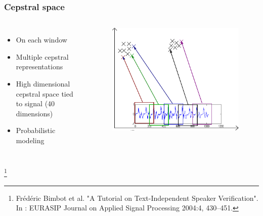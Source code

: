\documentclass[11pt,english]{beamer}
\newcommand\blfootnote[1]{%
 \begingroup
  \renewcommand\thefootnote{}\footnote{#1}%
  \addtocounter{footnote}{-1}%
  \endgroup
}
\begin{document}
\begin{frame}
  \frametitle{Cepstral space}
  \begin{columns}
    \begin{itemize}
    \item On each window
    \item Multiple cepstral representations
    \item High dimensional cepstral space tied to signal (40 dimensions)
    \item Probabilistic modeling
    \end{itemize}
      \begin{figure}
        \centering
       \includegraphics[scale = 0.5]{cepstral_space.pdf}
      \end{figure}
    \end{columns}
     \blfootnote{Frédéric Bimbot et al. "A Tutorial on Text-Independent Speaker Verification".  In : EURASIP Journal on Applied Signal Processing 2004:4, 430–451.}
\end{frame}
\end{document}
